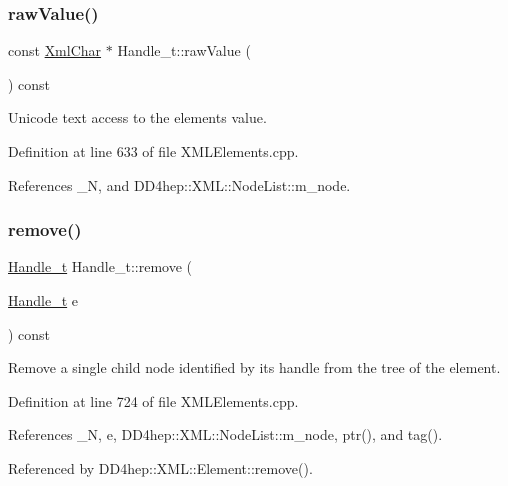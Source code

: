 \subsubsection{\texorpdfstring{raw\+Value()}{rawValue()}}
{\footnotesize\ttfamily const \hyperlink{namespace_d_d4hep_1_1_x_m_l_a09e5d9cc86ed782f6826dfe0778c1815}{Xml\+Char} $\ast$ Handle\+\_\+t\+::raw\+Value (\begin{DoxyParamCaption}{ }\end{DoxyParamCaption}) const}



Unicode text access to the element\textquotesingle{}s value. 



Definition at line 633 of file X\+M\+L\+Elements.\+cpp.



References \+\_\+N, and D\+D4hep\+::\+X\+M\+L\+::\+Node\+List\+::m\+\_\+node.

\hypertarget{class_d_d4hep_1_1_x_m_l_1_1_handle__t_a922e6bedf1cb36a5b5636241f8eae557}{}\label{class_d_d4hep_1_1_x_m_l_1_1_handle__t_a922e6bedf1cb36a5b5636241f8eae557} 
\subsubsection{\texorpdfstring{remove()}{remove()}}
{\footnotesize\ttfamily \hyperlink{class_d_d4hep_1_1_x_m_l_1_1_handle__t}{Handle\+\_\+t} Handle\+\_\+t\+::remove (\begin{DoxyParamCaption}\item[{\hyperlink{class_d_d4hep_1_1_x_m_l_1_1_handle__t}{Handle\+\_\+t}}]{e }\end{DoxyParamCaption}) const}



Remove a single child node identified by it\textquotesingle{}s handle from the tree of the element. 



Definition at line 724 of file X\+M\+L\+Elements.\+cpp.



References \+\_\+N, e, D\+D4hep\+::\+X\+M\+L\+::\+Node\+List\+::m\+\_\+node, ptr(), and tag().



Referenced by D\+D4hep\+::\+X\+M\+L\+::\+Element\+::remove().

